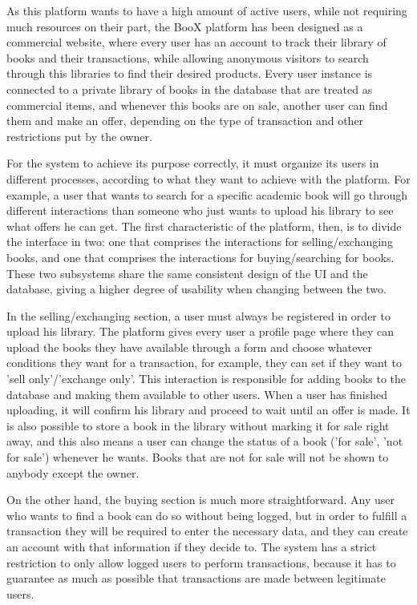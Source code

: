 \documentclass{article}
\begin{document}
As this platform wants to have a high amount of active users, while not requiring much resources on their part, the BooX platform has been designed as a commercial website, where every user has an account to track their library of books and their transactions, while allowing anonymous visitors to search through this libraries to find their desired products. Every user instance is connected to a private library of books in the database that are treated as commercial items, and whenever this books are on sale, another user can find them and make an offer, depending on the type of transaction and other restrictions put by the owner.

For the system to achieve its purpose correctly, it must organize its users in different processes, according to what they want to achieve with the platform. For example, a user that wants to search for a specific academic book will go through different interactions than someone who just wants to upload his library to see what offers he can get. The first characteristic of the platform, then, is to divide the interface in two: one that comprises the interactions for selling/exchanging books, and one that comprises the interactions for buying/searching for books. These two subsystems share the same consistent design of the UI and the database, giving a higher degree of usability when changing between the two.

In the selling/exchanging section, a user must always be registered in order to upload his library. The platform gives every user a profile page where they can upload the books they have available through a form and choose whatever conditions they want for a transaction, for example, they can set if they want to 'sell only'/'exchange only'. This interaction is responsible for adding books to the database and making them available to other users. When a user has finished uploading, it will confirm his library and proceed to wait until an offer is made. It is also possible to store a book in the library without marking it for sale right away, and this also means a user can change the status of a book ('for sale', 'not for sale') whenever he wants. Books that are not for sale will not be shown to anybody except the owner.

On the other hand, the buying section is much more straightforward. Any user who wants to find a book can do so without being logged, but in order to fulfill a transaction they will be required to enter the necessary data, and they can create an account with that information if they decide to. The system has a strict restriction to only allow logged users to perform transactions, because it has to guarantee as much as possible that transactions are made between legitimate users.
\end{document}
